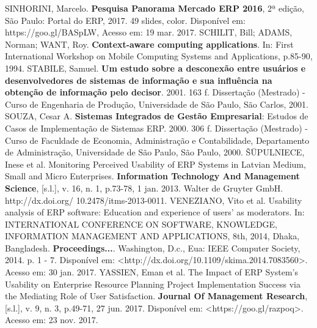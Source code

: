 \newline
\newline
\noindent
SINHORINI, Marcelo. \textbf{Pesquisa Panorama Mercado ERP 2016}, 2ª edição, São Paulo: Portal do ERP, 2017. 49 slides, color. Disponível em: https://goo.gl/BASpLW, Acesso em: 19 mar. 2017.
\newline
\newline
\noindent
SCHILIT, Bill; ADAMS, Norman; WANT, Roy. \textbf{Context-aware computing applications}. In: First International Workshop on Mobile Computing Systems and Applications, p.85-90, 1994.
\newline
\newline
\noindent
STABILE, Samuel. \textbf{Um estudo sobre a desconexão entre usuários e desenvolvedores de sistemas de informação e sua influência na obtenção de informação pelo decisor}. 2001. 163 f. Dissertação (Mestrado) - Curso de Engenharia de Produção, Universidade de São Paulo, São Carlos, 2001.
\newline
\newline
\noindent
SOUZA, Cesar A. \textbf{Sistemas Integrados de Gestão Empresarial}: Estudos de Casos de Implementação de Sistemas ERP. 2000. 306 f. Dissertação (Mestrado) - Curso de Faculdade de Economia, Administração e Contabilidade, Departamento de Administração, Universidade de São Paulo, São Paulo, 2000.
\newline
\newline
\noindent
ŠŪPULNIECE, Inese et al. Monitoring Perceived Usability of ERP Systems in Latvian Medium, Small and Micro Enterprises. \textbf{Information Technology And Management Science}, [s.l.], v. 16, n. 1, p.73-78, 1 jan. 2013. Walter de Gruyter GmbH. http://dx.doi.org/ 10.2478/itms-2013-0011.
\newline
\newline
\noindent
VENEZIANO, Vito et al. Usability analysis of ERP software: Education and experience of users' as moderators. In: INTERNATIONAL CONFERENCE ON SOFTWARE, KNOWLEDGE, INFORMATION MANAGEMENT AND APPLICATIONS, 8th, 2014, Dhaka, Bangladesh. \textbf{Proceedings...}. Washington, D.c., Eua: IEEE Computer Society, 2014. p. 1 - 7. Disponível em: <http://dx.doi.org/10.1109/skima.2014.7083560>. Acesso em: 30 jan. 2017.
\newline
\newline
\noindent
YASSIEN, Eman et al. The Impact of ERP System's Usability on Enterprise Resource Planning Project Implementation Success via the Mediating Role of User Satisfaction. \textbf{Journal Of Management Research}, [s.l.], v. 9, n. 3, p.49-71, 27 jun. 2017. Disponível em: <https://goo.gl/razpoq>. Acesso em: 23 nov. 2017.


